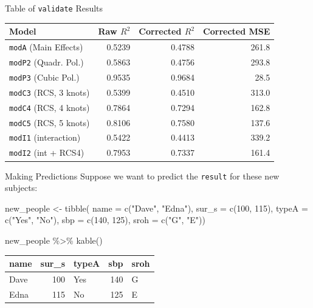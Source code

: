 \documentclass[
  ignorenonframetext,
]{beamer}
\newenvironment{Shaded}{\begin{snugshade}}{\end{snugshade}}
\newcommand{\AttributeTok}[1]{\textcolor[rgb]{0.77,0.63,0.00}{#1}}
\newcommand{\DecValTok}[1]{\textcolor[rgb]{0.00,0.00,0.81}{#1}}
\newcommand{\FunctionTok}[1]{\textcolor[rgb]{0.00,0.00,0.00}{#1}}
\newcommand{\NormalTok}[1]{#1}
\newcommand{\OtherTok}[1]{\textcolor[rgb]{0.56,0.35,0.01}{#1}}
\newcommand{\SpecialCharTok}[1]{\textcolor[rgb]{0.00,0.00,0.00}{#1}}
\newcommand{\StringTok}[1]{\textcolor[rgb]{0.31,0.60,0.02}{#1}}
\begin{document}
\begin{frame}[fragile]{Table of \texttt{validate} Results}
\protect\hypertarget{table-of-validate-results}{}
\begin{longtable}[]{@{}lrrr@{}}
\toprule
Model & Raw \(R^2\) & Corrected \(R^2\) & Corrected MSE \\
\midrule
\endhead
\texttt{modA} (Main Effects) & 0.5239 & 0.4788 & 261.8 \\
\texttt{modP2} (Quadr. Pol.) & 0.5863 & 0.4756 & 293.8 \\
\texttt{modP3} (Cubic Pol.) & 0.9535 & 0.9684 & 28.5 \\
\texttt{modC3} (RCS, 3 knots) & 0.5399 & 0.4510 & 313.0 \\
\texttt{modC4} (RCS, 4 knots) & 0.7864 & 0.7294 & 162.8 \\
\texttt{modC5} (RCS, 5 knots) & 0.8106 & 0.7580 & 137.6 \\
\texttt{modI1} (interaction) & 0.5422 & 0.4413 & 339.2 \\
\texttt{modI2} (int + RCS4) & 0.7953 & 0.7337 & 161.4 \\
\bottomrule
\end{longtable}
\end{frame}

\begin{frame}[fragile]{Making Predictions}
\protect\hypertarget{making-predictions}{}
Suppose we want to predict the \texttt{result} for these new subjects:

\begin{Shaded}
\begin{Highlighting}[]
\NormalTok{new\_people }\OtherTok{\textless{}{-}} \FunctionTok{tibble}\NormalTok{(}
    \AttributeTok{name =} \FunctionTok{c}\NormalTok{(}\StringTok{"Dave"}\NormalTok{, }\StringTok{"Edna"}\NormalTok{),}
    \AttributeTok{sur\_s =} \FunctionTok{c}\NormalTok{(}\DecValTok{100}\NormalTok{, }\DecValTok{115}\NormalTok{), }\AttributeTok{typeA =} \FunctionTok{c}\NormalTok{(}\StringTok{"Yes"}\NormalTok{, }\StringTok{"No"}\NormalTok{),}
    \AttributeTok{sbp =} \FunctionTok{c}\NormalTok{(}\DecValTok{140}\NormalTok{, }\DecValTok{125}\NormalTok{), }\AttributeTok{sroh =} \FunctionTok{c}\NormalTok{(}\StringTok{"G"}\NormalTok{, }\StringTok{"E"}\NormalTok{))}

\NormalTok{new\_people }\SpecialCharTok{\%\textgreater{}\%} \FunctionTok{kable}\NormalTok{()}
\end{Highlighting}
\end{Shaded}

\begin{longtable}[]{@{}lrlrl@{}}
\toprule
name & sur\_s & typeA & sbp & sroh \\
\midrule
\endhead
Dave & 100 & Yes & 140 & G \\
Edna & 115 & No & 125 & E \\
\bottomrule
\end{longtable}
\end{frame}
\end{document}
